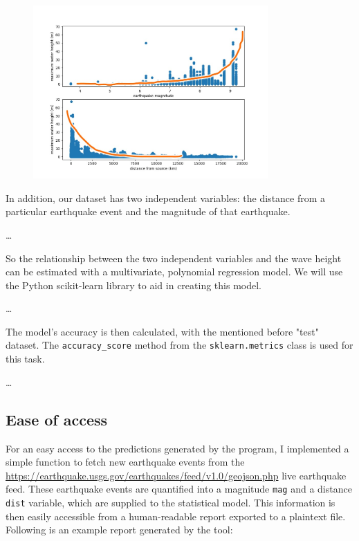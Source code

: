 \documentclass[11pt,letterpaper]{article}
\begin{document}
\begin{figure}[h]
    \centering
    \includegraphics[width=0.8\textwidth]{modelshowcase.jpeg}
    \label{fig:boat1}
\end{figure}

In addition, our dataset has two independent variables: the distance from a particular 
earthquake event and the magnitude of that earthquake. 





\dots

So the relationship between the two independent variables and the wave height can 
be estimated with a multivariate, polynomial regression model. We will use the Python 
scikit-learn library to aid in creating this model.  


\dots

The model's accuracy is then calculated, with the mentioned before "test" dataset. 
The \verb|accuracy_score| method from the \verb|sklearn.metrics| class is used for this 
task. 

\dots



\subsection{Ease of access}
For an easy access to the predictions generated by the program, I implemented 
a simple function to fetch new earthquake events from the \url{https://earthquake.usgs.gov/earthquakes/feed/v1.0/geojson.php} 
live earthquake feed. These earthquake events are quantified into a magnitude \verb|mag| 
and a distance \verb|dist| variable, which are supplied to the statistical model. 
This information is then easily accessible from a human-readable report exported 
to a plaintext file. Following is an example report generated by the tool: 
\end{document}
